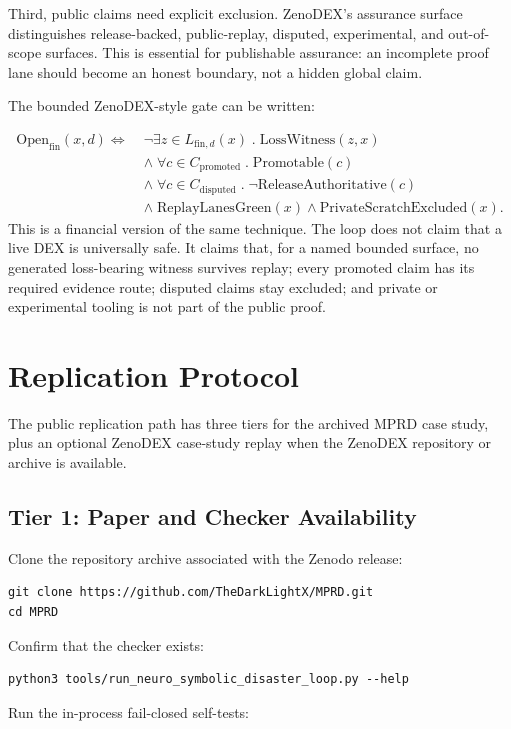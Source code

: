 \documentclass[11pt]{article}
\begin{document}
Third, public claims need explicit exclusion. ZenoDEX's assurance surface distinguishes release-backed, public-replay, disputed, experimental, and out-of-scope surfaces. This is essential for publishable assurance: an incomplete proof lane should become an honest boundary, not a hidden global claim.

The bounded ZenoDEX-style gate can be written:

\[
\begin{aligned}
\mathrm{Open}_{\mathrm{fin}}(x,d)\Longleftrightarrow\;&
\neg\exists z\in L_{\mathrm{fin},d}(x)\;.\;
\mathrm{LossWitness}(z,x)\\
&\wedge\;\forall c\in C_{\mathrm{promoted}}\;.\;
\mathrm{Promotable}(c)\\
&\wedge\;\forall c\in C_{\mathrm{disputed}}\;.\;
\neg\mathrm{ReleaseAuthoritative}(c)\\
&\wedge\;\mathrm{ReplayLanesGreen}(x)
\wedge\mathrm{PrivateScratchExcluded}(x).
\end{aligned}
\]
This is a financial version of the same technique. The loop does not claim that a live DEX is universally safe. It claims that, for a named bounded surface, no generated loss-bearing witness survives replay; every promoted claim has its required evidence route; disputed claims stay excluded; and private or experimental tooling is not part of the public proof.

\section{Replication Protocol}
The public replication path has three tiers for the archived MPRD case study, plus an optional ZenoDEX case-study replay when the ZenoDEX repository or archive is available.

\subsection{Tier 1: Paper and Checker Availability}
Clone the repository archive associated with the Zenodo release:

\begin{verbatim}
git clone https://github.com/TheDarkLightX/MPRD.git
cd MPRD
\end{verbatim}
Confirm that the checker exists:

\begin{verbatim}
python3 tools/run_neuro_symbolic_disaster_loop.py --help
\end{verbatim}
Run the in-process fail-closed self-tests:
\end{document}
